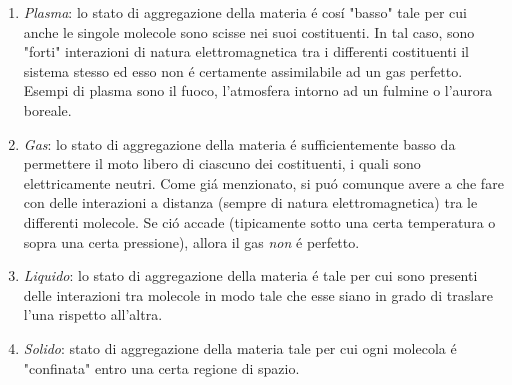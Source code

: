 \documentclass[17pt]{extarticle}
\begin{document}
\begin{enumerate}
	\item \emph{Plasma}: lo stato di aggregazione della materia \'e cos\'i "basso" tale per cui anche le singole molecole sono scisse nei suoi costituenti. In tal caso, sono "forti" interazioni di natura elettromagnetica tra i differenti costituenti il sistema stesso ed esso non \'e certamente assimilabile ad un gas perfetto. Esempi di plasma sono il fuoco, l'atmosfera intorno ad un fulmine o l'aurora boreale.
	\item \emph{Gas}: lo stato di aggregazione della materia \'e sufficientemente basso da permettere il moto libero di ciascuno dei costituenti, i quali sono elettricamente neutri. Come gi\'a menzionato, si pu\'o comunque avere a che fare con delle interazioni a distanza (sempre di natura elettromagnetica) tra le differenti molecole. Se ci\'o accade (tipicamente sotto una certa temperatura o sopra una certa pressione), allora il gas \emph{non} \'e perfetto.
	\item \emph{Liquido}: lo stato di aggregazione della materia \'e tale per cui sono presenti delle interazioni tra molecole in modo tale che esse siano in grado di traslare l'una rispetto all'altra.
	\item \emph{Solido}: stato di aggregazione della materia tale per cui ogni molecola \'e "confinata" entro una certa regione di spazio.
\end{enumerate}
\end{document}
